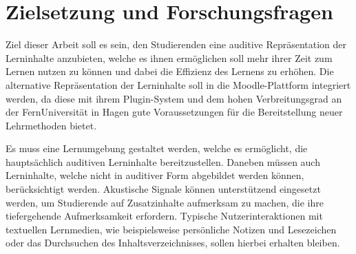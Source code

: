 %
%
%


\section{Zielsetzung und Forschungsfragen}
\label{sec:zielsetzung}
Ziel dieser Arbeit soll es sein, den Studierenden eine auditive Repräsentation der Lerninhalte anzubieten, welche es ihnen ermöglichen soll mehr ihrer Zeit zum Lernen nutzen zu können und dabei die Effizienz des Lernens zu erhöhen. Die alternative Repräsentation der Lerninhalte soll in die Moodle-Plattform integriert werden, da diese mit ihrem Plugin-System und dem hohen Verbreitungsgrad an der FernUniversität in Hagen gute Voraussetzungen für die Bereitstellung neuer Lehrmethoden bietet. %

Es muss eine Lernumgebung gestaltet werden, welche es ermöglicht, die hauptsächlich auditiven Lerninhalte bereitzustellen. Daneben müssen auch Lerninhalte, welche nicht in auditiver Form abgebildet werden können, berücksichtigt werden. Akustische Signale können unterstützend eingesetzt werden, um Studierende auf Zusatzinhalte aufmerksam zu machen, die ihre tiefergehende Aufmerksamkeit erfordern. Typische Nutzerinteraktionen mit textuellen Lernmedien, wie beispielsweise persönliche Notizen und Lesezeichen oder das Durchsuchen des Inhaltsverzeichnisses, sollen hierbei erhalten bleiben.

